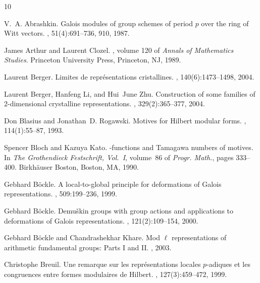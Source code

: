 \documentclass[12pt]{article}
\begin{document}
\nocite{*}

\begin{thebibliography}{10}

\bibitem{[A89]}
V.~A. Abrashkin.
\newblock Galois modules of group schemes of period {$p$} over the ring of
  {W}itt vectors.
, 51(4):691--736, 910, 1987.

James Arthur and Laurent Clozel.
, volume 120 of {\em Annals of Mathematics Studies}.
\newblock Princeton University Press, Princeton, NJ, 1989.

Laurent Berger.
\newblock Limites de repr\'esentations cristallines.
, 140(6):1473--1498, 2004.

Laurent Berger, Hanfeng Li, and Hui~June Zhu.
\newblock Construction of some families of 2-dimensional crystalline
  representations.
, 329(2):365--377, 2004.

Don Blasius and Jonathan~D. Rogawski.
\newblock Motives for {H}ilbert modular forms.
, 114(1):55--87, 1993.

\bibitem{[BK]}
Spencer Bloch and Kazuya Kato.
-functions and {T}amagawa numbers of motives.
\newblock In {\em The Grothendieck Festschrift, Vol.\ I}, volume~86 of {\em
  Progr. Math.}, pages 333--400. Birkh\"auser Boston, Boston, MA, 1990.

Gebhard B{\"o}ckle.
\newblock A local-to-global principle for deformations of {G}alois
  representations.
, 509:199--236, 1999.

\bibitem{[B00]}
Gebhard B{\"o}ckle.
\newblock Demu\v skin groups with group actions and applications to
  deformations of {G}alois representations.
, 121(2):109--154, 2000.

Gebhard B{\"o}ckle and Chandrashekhar Khare.
\newblock Mod $\ell$ representations of arithmetic fundamental groups: Parts
  {I} and {II}.
, 2003.

Christophe Breuil.
\newblock Une remarque sur les repr\'esentations locales {$p$}-adiques et les
  congruences entre formes modulaires de {H}ilbert.
, 127(3):459--472, 1999.


\end{thebibliography}
\end{document}

